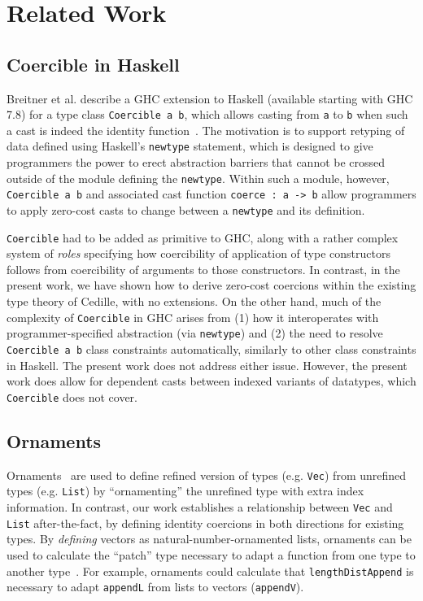 \documentclass[a4paper,envcountsame,envcountsect]{llncs}
\newcommand{\labsec}[1]{\label{sec:#1}}
\begin{document}
\section{Related Work}
\labsec{related}

\subsection{Coercible in Haskell}

Breitner et al. describe a GHC extension to Haskell (available
starting with GHC 7.8) for a type class \verb|Coercible a b|, which
allows casting from \verb|a| to \verb|b| when such a cast is indeed
the identity function~\cite{breitner+16}.  The motivation is to support retyping of data
defined using Haskell's \verb|newtype| statement, which is designed to
give programmers the power to erect abstraction barriers that cannot
be crossed outside of the module defining the \verb|newtype|.  Within
such a module, however, \verb|Coercible a b| and associated cast
function \verb|coerce : a -> b| allow programmers to apply zero-cost
casts to change between a \verb|newtype| and its definition.

\verb|Coercible| had to be added as primitive to GHC, along with a
rather complex system of \emph{roles} specifying how coercibility of
application of type constructors follows from coercibility of
arguments to those constructors.  In contrast, in the present work, we
have shown how to derive zero-cost coercions within the existing type
theory of Cedille, with no extensions.  On the other hand, much of the
complexity of \verb|Coercible| in GHC arises from (1) how it
interoperates with programmer-specified abstraction (via
\verb|newtype|) and (2) the need to resolve \verb|Coercible a b| class
constraints automatically, similarly to other class constraints in
Haskell.  The present work does not address either issue.
However, the present work does allow for dependent casts between
indexed variants of datatypes, which \verb|Coercible| does not cover.

\subsection{Ornaments}

Ornaments~\cite{ornaments:original} are used to define refined
version of types (e.g. \texttt{Vec}) from unrefined types
(e.g. \texttt{List}) by ``ornamenting'' the unrefined type with extra
index information. In contrast, our work establishes a relationship
between \texttt{Vec} and \texttt{List} after-the-fact, by defining
identity coercions in both directions for existing types.
By \textit{defining} vectors as natural-number-ornamented lists,
ornaments can be used to calculate the ``patch'' type necessary to adapt a
function from one type to another type~\cite{ornaments:functional}.
For example, ornaments could
calculate that \texttt{lengthDistAppend} is necessary to adapt
\texttt{appendL} from lists to vectors (\texttt{appendV}).
\end{document}
